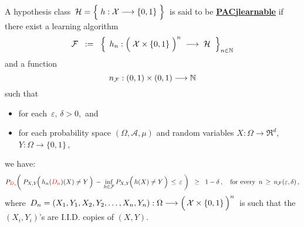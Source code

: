 \begin{definition}
\mbox{}\vskip 0.1cm
\noindent
A hypothesis class
\,$\mathcal{H} = \left\{\; h : \mathcal{X} \overset{{\color{white}-}}{\longrightarrow} \{0,1\} \;\right\}$\,
is said to be \underline{\textbf{PAC{\color{white}j}learnable}} if
there exist
a learning algorithm
\begin{equation*}
\mathcal{F}
\;\; : = \;\;
	\left\{\;\,
		h_{n} : \left(\;\mathcal{X} \overset{{\color{white}.}}{\times} \{0,1\} \;\right)^{n}
		\; \longrightarrow \;\mathcal{H}
		\;\;\right\}_{n\in\N}
\end{equation*}
and a function
\begin{equation*}
n_{\mathcal{F}} : (0,1) \times (0,1) \longrightarrow \mathbb{N}
\end{equation*}
such that
\begin{itemize}
\item
	for each \,$\varepsilon,\, \delta > 0$,\, and
\item
	for each probability space $(\Omega,\mathcal{A},\mu)$ and
	random variables $X : \Omega \longrightarrow \Re^{d}$,
	$Y : \Omega \longrightarrow \{0,1\}$\,,
\end{itemize}
we have:
\begin{equation*}
P_{{\color{red}D_{n}}}\!\!\left(\;
	P_{X,Y}\!\!\left(\,\overset{{\color{white}.}}{h}_{n}({\color{red}D_{n}})(X) \neq Y \,\right)
		\,-\,
		\underset{h\in\mathcal{F}}{\inf}\,P_{X,Y}\!\!\left(\,\overset{{\color{white}.}}{h}(X) \neq Y \,\right)
	\,\leq\,
		\varepsilon
	\;\right)
\;\; \geq \;\;
	1 - \delta\,,
\quad
	\textnormal{for every \,$n \,\geq\, n_{\mathcal{F}}(\varepsilon,\delta)$}\,,
\end{equation*}
where
\,$D_{n} = (X_{1},Y_{1},X_{2},Y_{2},\ldots,X_{n},Y_{n})
	: \Omega \longrightarrow
	\left(\,\mathcal{X}\overset{{\color{white}.}}{\times}\{0,1\}\,\right)^{n}$\,
is such that the
$(X_{i},Y_{i})$'s are I.I.D. copies of $(X,Y)$.
\end{definition}

